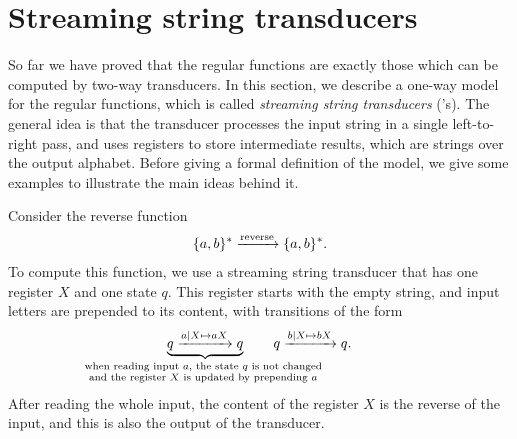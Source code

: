 \section{Streaming string transducers}
\label{sec:sst}
So far we have proved that the regular functions are exactly those which can be computed by two-way transducers. In this section, we describe a one-way model for the regular functions, which is called \emph{streaming string transducers} (\sst's).  The general idea is that the transducer processes the input string in a single left-to-right pass, and uses registers to store intermediate results, which are strings over the output alphabet. Before giving a formal definition of the model, we give some examples to illustrate the main ideas behind it.

\begin{myexample}[Reverse]
    \label{ex:reverse-function-sst}
    Consider the reverse function 
    \begin{align*}
    \{a,b\}^* 
    \xrightarrow {\text{reverse}}
    \{a,b\}^*.
    \end{align*}
    To compute this function, we use a streaming string transducer that has one register $X$ and one state $q$. This register starts with the empty string, and input letters are prepended to its content, with transitions of the form
    \begin{align*}
      \myunderbrace{q
        \xrightarrow {a \mid X \mapsto aX}
        q}{when reading input $a$, the state $q$ is not changed \\ and the register $X$ is updated by prepending $a$} \qquad
        q   
        \xrightarrow {b \mid X \mapsto bX}
        q.
    \end{align*}
    After reading the whole input, the content of the register $X$ is the reverse of the input, and this is also the output of the transducer.
\end{myexample}

